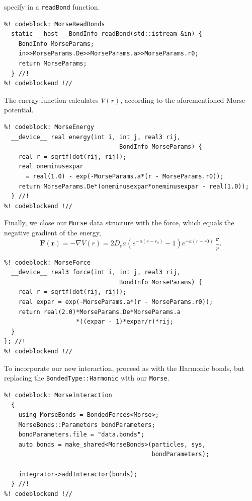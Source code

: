 specify in a \texttt{readBond} function.
\begin{lstlisting}
%! codeblock: MorseReadBonds
  static __host__ BondInfo readBond(std::istream &in) {
    BondInfo MorseParams;
    in>>MorseParams.De>>MorseParams.a>>MorseParams.r0;
    return MorseParams;
  } //!
%! codeblockend !//
\end{lstlisting}
The energy function calculates $V(r)$, according to the aforementioned Morse
potential.
\begin{lstlisting}
%! codeblock: MorseEnergy
  __device__ real energy(int i, int j, real3 rij,
                                BondInfo MorseParams) {
    real r = sqrtf(dot(rij, rij));
    real oneminusexpar
      = real(1.0) - exp(-MorseParams.a*(r - MorseParams.r0));
    return MorseParams.De*(oneminusexpar*oneminusexpar - real(1.0));
  } //!
%! codeblockend !//
\end{lstlisting}
Finally, we close our \texttt{Morse} data structure with the force, which equals
the negative gradient of the energy,
\begin{equation*}
  \mathbf{F}(\mathbf{r})
    = -\nabla V(r)
    = 2 D_e a \left(e^{-a(r - r_0)} - 1\right)
              e^{-a(r - r0)}\ \frac{\mathbf{r}}{r}.
\end{equation*}
\begin{lstlisting}
%! codeblock: MorseForce
  __device__ real3 force(int i, int j, real3 rij,
                                BondInfo MorseParams) {
    real r = sqrtf(dot(rij, rij));
    real expar = exp(-MorseParams.a*(r - MorseParams.r0));
    return real(2.0)*MorseParams.De*MorseParams.a
                    *((expar - 1)*expar/r)*rij;
  }
}; //!
%! codeblockend !//
\end{lstlisting}

To incorporate our new interaction, proceed as with the Harmonic bonds, but
replacing the \texttt{BondedType::Harmonic} with our \texttt{Morse}.
\begin{lstlisting}
%! codeblock: MorseInteraction
  {
    using MorseBonds = BondedForces<Morse>;
    MorseBonds::Parameters bondParameters;
    bondParameters.file = "data.bonds";
    auto bonds = make_shared<MorseBonds>(particles, sys,
                                         bondParameters);

    integrator->addInteractor(bonds);
  } //!
%! codeblockend !//
\end{lstlisting}

